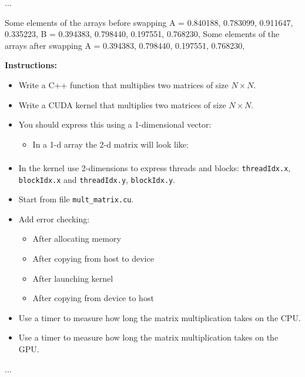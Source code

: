 \documentclass{article}
\newcounter{exercise}
\newenvironment{exr}[1]{%
    \refstepcounter{exercise}
    \begin{tcolorbox}[colback=blue!5!white, colframe=blue!75!black, title=Exercise \theexercise]
    \textbf{Instructions:} #1
    \end{tcolorbox}
    \vspace{1em}
}{}
\begin{document}
...




\begin{out}
Some elements of the arrays before swapping
A = 0.840188, 0.783099, 0.911647, 0.335223, 
B = 0.394383, 0.798440, 0.197551, 0.768230, 
Some elements of the arrays after swapping
A = 0.394383, 0.798440, 0.197551, 0.768230, 
\end{out}




\begin{exr}{
    \begin{itemize}
      \item Write a C++ function that multiplies two matrices of size $N\times N$.
      \item Write a CUDA kernel that multiplies two matrices of size $N\times N$.
      \item You should express this using a 1-dimensional vector:
        \begin{itemize}
          \item In a 1-d array the 2-d matrix will look like: 
          \begin{align*}
              [A_{11},\, A_{12},\, A_{13},\, \dots,\, A_{1N}, A_{21},\, A_{22},\, \dots,\, A_{2N}, \dots, A_{N1},\, A_{N2},\, \dots,\, A_{NN}]
          \end{align*}
        \end{itemize}
      \item In the kernel use 2-dimensions to express threads and blocks: \texttt{threadIdx.x}, \texttt{blockIdx.x} and \texttt{threadIdx.y}, \texttt{blockIdx.y}.
      \item Start from file \texttt{mult\_matrix.cu}.
      \item Add error checking:
        \begin{itemize}
          \item After allocating memory
          \item After copying from host to device
          \item After launching kernel
          \item After copying from device to host
        \end{itemize}
      \item Use a timer to measure how long the matrix multiplication takes on the CPU.
      \item Use a timer to measure how long the matrix multiplication takes on the GPU.
    \end{itemize}
}\end{exr}

...


\end{document}
